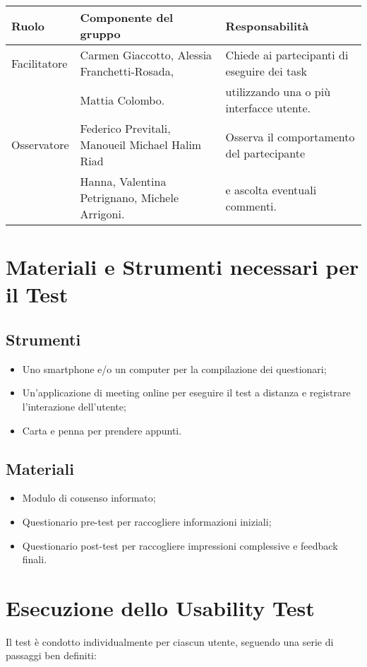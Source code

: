 \documentclass{article}
\begin{document}
\begin{table}[h!]
    \centering
    \begin{tabular}{|l|l|p{7cm}|}
        \hline
        \textbf{Ruolo} & \textbf{Componente del gruppo} & \textbf{Responsabilit\`a} \\
        \hline
        Facilitatore & Carmen Giaccotto, Alessia Franchetti-Rosada, & Chiede ai partecipanti di eseguire dei task \\ & Mattia Colombo. & utilizzando una o pi\`u interfacce utente.\\
        \hline
        Osservatore & Federico Previtali, Manoueil Michael Halim Riad & Osserva il comportamento del partecipante \\ & Hanna, Valentina Petrignano, Michele Arrigoni. & e ascolta eventuali commenti.\\
        \hline
    \end{tabular}
\end{table}

\section{Materiali e Strumenti necessari per il Test}
\subsection*{Strumenti}
\begin{itemize}
    \item Uno smartphone e/o un computer per la compilazione dei questionari;
    \item Un’applicazione di meeting online per eseguire il test a distanza e registrare l’interazione dell’utente;
    \item Carta e penna per prendere appunti.
\end{itemize}

\subsection*{Materiali}
\begin{itemize}
    \item Modulo di consenso informato;
    \item Questionario pre-test per raccogliere informazioni iniziali;
    \item Questionario post-test per raccogliere impressioni complessive e feedback finali.
\end{itemize}

\section{Esecuzione dello Usability Test}
Il test è condotto individualmente per ciascun utente, seguendo una serie di passaggi ben definiti:
\end{document}
